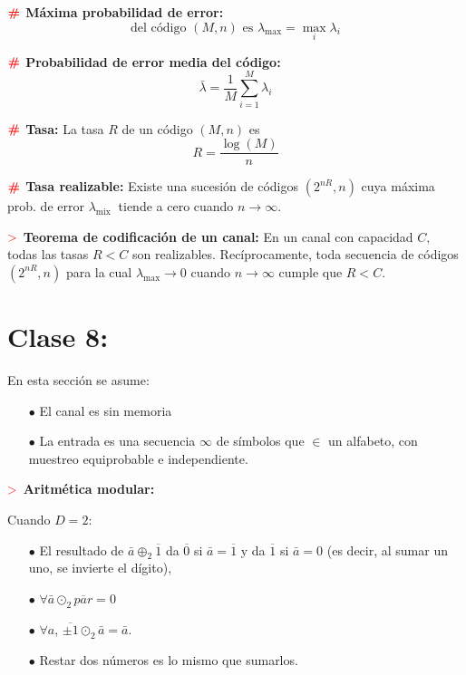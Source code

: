 \documentclass[%
 reprint,
 amsmath,amssymb,
 aps,
]{revtex4-1}
\begin{document}
\textbf{$\color{red}{\textbf{\#}}$ Máxima probabilidad de error:} 
$$
\text{del código } (M, n) \text{ es }
\lambda_{\operatorname{max}}=\operatorname{max}_{i} \lambda_{i}
$$

\textbf{$\color{red}{\textbf{\#}}$ Probabilidad de error media del código:} 
$$
\bar{\lambda}=\frac{1}{M} \sum_{i=1}^{M} \lambda_{i}
$$

\textbf{$\color{red}{\textbf{\#}}$ Tasa:} 
La tasa $R$ de un código $(M, n)$ es
$$
R=\frac{\log (M)}{n}
$$

\textbf{$\color{red}{\textbf{\#}}$ Tasa realizable:} 
Existe una sucesión de códigos $\left(2^{n R}, n\right)$ cuya máxima prob. de error $\lambda_{\text {mix }}$ tiende a cero cuando $n \rightarrow \infty$.

\textbf{$\textcolor{red}{\mathbf{>}}$ Teorema de codificación de un canal:} 
En un canal con capacidad $C,$ todas las tasas $R<C$ son realizables. Recíprocamente, toda secuencia de códigos $\left(2^{n R}, n\right)$ para la cual $\lambda_{\operatorname{max}} \rightarrow 0$ cuando $n \rightarrow \infty$ cumple que $R<C$.

\section{Clase 8:}

En esta sección se asume:
\begin{itemize}
  \item[$\bullet$] El canal es sin memoria
  \item[$\bullet$] La entrada es una secuencia $\infty$ de símbolos que $\in$ un alfabeto, con muestreo equiprobable e independiente.
\end{itemize}

\textbf{$\textcolor{red}{\mathbf{>}}$ Aritmética modular:}

Cuando $D=2$:
\begin{itemize}
  \item[$\bullet$] El resultado de $\bar{a} \oplus_{2} \overline{1}$ da $\overline{0}$ si $\bar{a}=\overline{1}$ y da $\overline{1}$ si $\bar{a}=0$ (es decir, al sumar un uno, se invierte el dígito),
  \item[$\bullet$] $\forall \bar{a} \odot_{2} \overline{par}=0$
  \item[$\bullet$] $\forall a$,
  $\overline{\pm1} \odot_{2} \bar{a}=\bar{a}$.
  \item[$\bullet$] Restar dos números es lo mismo que sumarlos.
\end{itemize}
\end{document}
